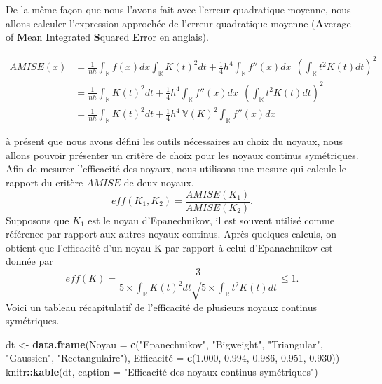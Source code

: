 \documentclass[
]{book}
\newenvironment{Shaded}{\begin{snugshade}}{\end{snugshade}}
\newcommand{\DataTypeTok}[1]{\textcolor[rgb]{0.13,0.29,0.53}{#1}}
\newcommand{\FloatTok}[1]{\textcolor[rgb]{0.00,0.00,0.81}{#1}}
\newcommand{\KeywordTok}[1]{\textcolor[rgb]{0.13,0.29,0.53}{\textbf{#1}}}
\newcommand{\NormalTok}[1]{#1}
\newcommand{\OperatorTok}[1]{\textcolor[rgb]{0.81,0.36,0.00}{\textbf{#1}}}
\newcommand{\StringTok}[1]{\textcolor[rgb]{0.31,0.60,0.02}{#1}}
\theoremstyle{definition}
\theoremstyle{definition}
\theoremstyle{definition}
\theoremstyle{definition}
\theoremstyle{remark}
\begin{document}
De la même façon que nous l'avons fait avec l'erreur quadratique moyenne, nous allons calculer l'expression approchée de l'erreur quadratique moyenne (\textbf{A}verage of \textbf{M}ean \textbf{I}ntegrated \textbf{S}quared \textbf{E}rror en anglais).

\[
\begin{aligned}
AMISE(x)&= \frac1{nh} \int_{\mathbb R}f(x)dx \int_{\mathbb R}K(t)^2 dt + \frac14h^4 \int_{\mathbb R}f''(x)dx ~~\left(\int_{\mathbb R} t^2K(t) dt \right)^2\\
&= \frac1{nh} \int_{\mathbb R}K(t)^2 dt 
+ \frac14h^4 \int_{\mathbb R}f''(x)dx ~~\left(\int_{\mathbb R} t^2K(t) dt \right)^2\\
&= \frac1{nh} \int_{\mathbb R}K(t)^2 dt 
+ \frac14h^4 ~ \mathbb V (K)^2 \int_{\mathbb R}f''(x)dx 
\end{aligned}
\]

\hspace*{0.5cm} à présent que nous avons défini les outils nécessaires au choix du noyaux, nous allons pouvoir présenter un critère de choix pour les noyaux continus symétriques. Afin de mesurer l'efficacité des noyaux, nous utilisons une mesure qui calcule le rapport du critère \(AMISE\) de deux noyaux.
\[
eff(K_1,K_2) = \frac{AMISE(K_1)}{AMISE(K_2)}.
\]
Supposons que \(K_1\) est le noyau d'Epanechnikov, il est souvent utilisé comme référence par rapport aux autres noyaux continus. Après quelques calculs, on obtient que l'efficacité d'un noyau K par rapport à celui d'Epanachnikov est donnée par
\[
eff(K) = \frac{3}{5\times \int_{\mathbb R}K(t)^2 dt\sqrt{5 \times\int_{\mathbb R}t^2K(t) dt} } \leq1.
\]
Voici un tableau récapitulatif de l'efficacité de plusieurs noyaux continus symétriques.

\begin{Shaded}
\begin{Highlighting}[]
\NormalTok{dt <-}\StringTok{ }\KeywordTok{data.frame}\NormalTok{(}\DataTypeTok{Noyau =} \KeywordTok{c}\NormalTok{(}\StringTok{"Epanechnikov"}\NormalTok{, }\StringTok{"Bigweight"}\NormalTok{, }\StringTok{"Triangular"}\NormalTok{,}
\StringTok{"Gaussien"}\NormalTok{, }\StringTok{"Rectangulaire"}\NormalTok{), Efficacité =}\StringTok{ }\KeywordTok{c}\NormalTok{(}\FloatTok{1.000}\NormalTok{, }\FloatTok{0.994}\NormalTok{, }\FloatTok{0.986}\NormalTok{, }\FloatTok{0.951}\NormalTok{, }\FloatTok{0.930}\NormalTok{))}
\NormalTok{knitr}\OperatorTok{::}\KeywordTok{kable}\NormalTok{(dt, }\DataTypeTok{caption =} \StringTok{"Efficacité des noyaux continus symétriques"}\NormalTok{)}
\end{Highlighting}
\end{Shaded}
\end{document}
